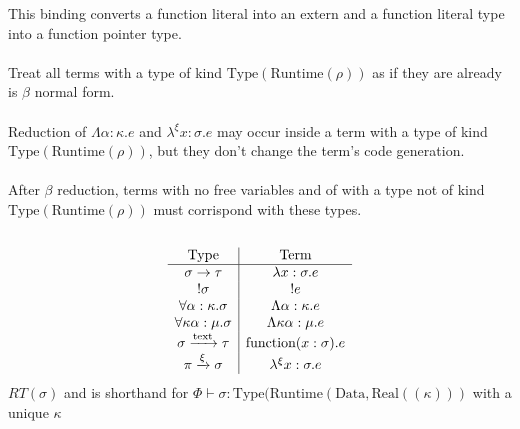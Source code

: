 \documentclass {article}
\begin{document}
This binding converts a function literal into an extern and a function literal type into a function pointer type. \\
\\
Treat all terms with a type of kind $ \text{Type} (\text{Runtime} (\rho)) $ as if they are already is $ \beta $ normal form. \\
\\
Reduction of $ \Lambda \alpha : \kappa. e $ and $ \lambda^\xi x : \sigma. e $ may occur inside a term with a type of kind $ \text{Type} (\text{Runtime} (\rho)) $, but they don't
change the term's code generation. \\
\\
After $ \beta $ reduction, terms with no free variables and of with a type not of kind $ \text{Type} (\text{Runtime} (\rho) ) $ must corrispond with these types. \\
\\
\begin{gather*}
\begin{array}{c | c}
\text{Type} & \text{Term} \\
\hline
\sigma \to \tau & \lambda x : \sigma. e \\
!\sigma & !e \\
\forall \alpha : \kappa. \sigma & \Lambda \alpha : \kappa. e  \\
\forall \kappa \alpha : \mu. \sigma & \Lambda \kappa \alpha : \mu. e \\
\sigma \xrightarrow{\text{text}} \tau & \text{function}(x : \sigma). e \\
\pi \xrightarrow{\xi} \sigma & \lambda^\xi x : \sigma. e
\end{array}
\\
\end{gather*}
$ RT (\sigma) $ and is shorthand for $ \Phi \vdash \sigma : \text{Type} (\text{Runtime} (\text{Data}, \text{Real} ((\kappa))) $ with a unique $ \kappa $ \\
\end{document}
